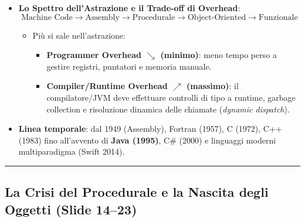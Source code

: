 \documentclass[11pt,a4paper,oneside]{report}
\providecommand{\tightlist}{\setlength{\itemsep}{0pt}\setlength{\parskip}{0pt}}
\begin{document}
\begin{itemize}
\begin{enumerate}
    \begin{itemize}
    \tightlist
    \item
      Unisce il nucleo imperativo (gli oggetti contengono uno stato
      interno) a tratti dichiarativi (gli oggetti espongono
      comportamenti invocabili senza conoscerne l'algoritmo interno).
    \item
      Basato su \textbf{istanze} che comunicano tramite
      \textbf{passaggio di messaggi}.
    \end{itemize}
  \end{enumerate}
\item
  \textbf{Lo Spettro dell'Astrazione e il Trade-off di Overhead}:
  \[\text{Machine Code} \longrightarrow \text{Assembly} \longrightarrow \text{Procedurale} \longrightarrow \text{Object-Oriented} \longrightarrow \text{Funzionale}\]

  \begin{itemize}
  \tightlist
  \item
    Più si sale nell'astrazione:

    \begin{itemize}
    \tightlist
    \item
      \textbf{Programmer Overhead \(\searrow\) (minimo)}: meno tempo
      perso a gestire registri, puntatori e memoria manuale.
    \item
      \textbf{Compiler/Runtime Overhead \(\nearrow\) (massimo)}: il
      compilatore/JVM deve effettuare controlli di tipo a runtime,
      garbage collection e risoluzione dinamica delle chiamate
      (\emph{dynamic dispatch}).
    \end{itemize}
  \end{itemize}
\item
  \textbf{Linea temporale}: dal 1949 (Assembly), Fortran (1957), C
  (1972), C++ (1983) fino all'avvento di \textbf{Java (1995)}, C\#
  (2000) e linguaggi moderni multiparadigma (Swift 2014).
\end{itemize}

\begin{center}\rule{0.5\linewidth}{0.5pt}\end{center}

\subsection{La Crisi del Procedurale e la Nascita degli Oggetti (Slide
14--23)}\label{chap02_la-crisi-del-procedurale-e-la-nascita-degli-oggetti-slide-1423}
\end{document}
